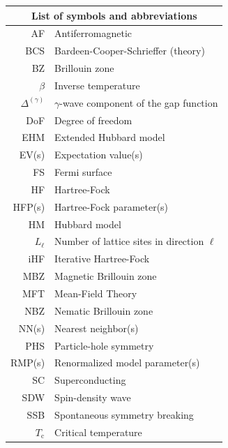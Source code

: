 
	\thispagestyle{plain}
	\begin{table}
		\centering
		\begin{tabular}{r l}
			\multicolumn{2}{c}{\textbf{List of symbols and abbreviations}} \\
			\midrule
			AF & Antiferromagnetic \\
			BCS & Bardeen-Cooper-Schrieffer (theory) \\
			BZ & Brillouin zone \\
			$\beta$ & Inverse temperature \\
			$\Delta^{(\gamma)}$ & $\gamma$-wave component of the gap function \\ 
			DoF & Degree of freedom \\
			EHM & Extended Hubbard model \\
			EV(s) & Expectation value(s) \\
			FS & Fermi surface \\
			HF & Hartree-Fock \\
			HFP(s) & Hartree-Fock parameter(s) \\
			HM & Hubbard model \\
			$L_\ell$ & Number of lattice sites in direction $\ell$ \\
			iHF & Iterative Hartree-Fock \\
			MBZ & Magnetic Brillouin zone \\
			MFT & Mean-Field Theory \\
			NBZ & Nematic Brillouin zone \\
			NN(s) & Nearest neighbor(s) \\
			PHS & Particle-hole symmetry \\
			RMP(s) & Renormalized model parameter(s) \\
			SC & Superconducting \\
			SDW & Spin-density wave \\
			SSB & Spontaneous symmetry breaking \\
			$T_\mathrm{c}$ & Critical temperature \\
			\midrule
		\end{tabular}
	\end{table}
\restoregeometry 
